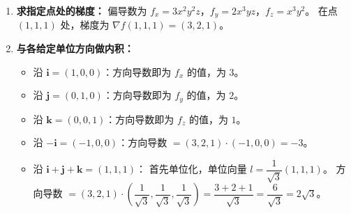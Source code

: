 \documentclass[lang=cn,11pt]{elegantbook}
\begin{document}
\begin{solution}
\begin{enumerate}
  \item \textbf{求指定点处的梯度：}
  偏导数为 $f_x = 3x^2y^2z$，$f_y = 2x^3yz$，$f_z = x^3y^2$。
  在点 $(1,1,1)$ 处，梯度为 $\nabla f(1,1,1) = (3, 2, 1)$。

  \item \textbf{与各给定单位方向做内积：}
  \begin{itemize}
    \item[(1)] 沿 $\boldsymbol{i} = (1,0,0)$：方向导数即为 $f_x$ 的值，为 $3$。
    \item[(2)] 沿 $\boldsymbol{j} = (0,1,0)$：方向导数即为 $f_y$ 的值，为 $2$。
    \item[(3)] 沿 $\boldsymbol{k} = (0,0,1)$：方向导数即为 $f_z$ 的值，为 $1$。
    \item[(4)] 沿 $-\boldsymbol{i} = (-1,0,0)$：方向导数 $= (3,2,1)\cdot(-1,0,0) = -3$。
    \item[(5)] 沿 $\boldsymbol{i}+\boldsymbol{j}+\boldsymbol{k} = (1,1,1)$：
          首先单位化，单位向量 $l = \dfrac{1}{\sqrt{3}}(1,1,1)$。
          方向导数 $= (3,2,1)\cdot\left(\dfrac{1}{\sqrt{3}}, \dfrac{1}{\sqrt{3}}, \dfrac{1}{\sqrt{3}}\right) = \dfrac{3+2+1}{\sqrt{3}} = \dfrac{6}{\sqrt{3}} = 2\sqrt{3}$。
  \end{itemize}
\end{enumerate}
\end{solution}
\end{document}
